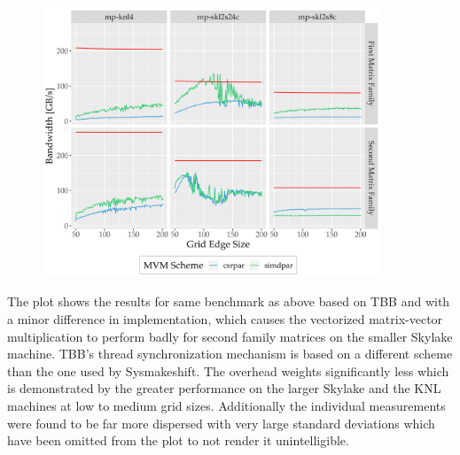     \begin{figure}[H]
      \centering
      \captionsetup{width=0.9\textwidth}
      \includegraphics[width=0.9\textwidth]{assets/mvm-perturbed-old}
       {}
      \label{fig:mvm-perturbed-old}
    \end{figure}

    The plot shows the results for same benchmark as above based on TBB and with a minor difference in implementation,
    which causes the vectorized matrix-vector multiplication to perform badly for second family matrices on the smaller
    Skylake machine. TBB's thread synchronization mechanism is based on a different scheme than the one used by
    Sysmakeshift. The overhead weights significantly less which is demonstrated by the greater performance on the larger
    Skylake and the KNL machines at low to medium grid sizes. Additionally the individual measurements were found to be
    far more dispersed with very large standard deviations which have been omitted from the plot to not render it
    unintelligible.

